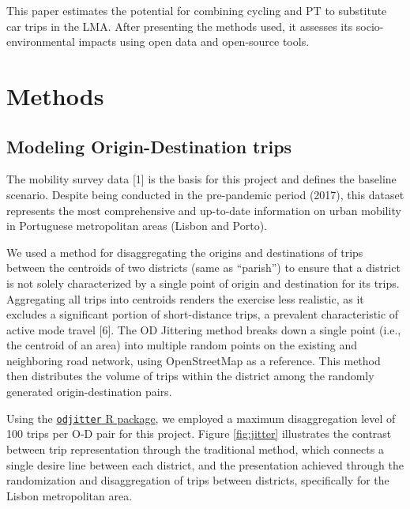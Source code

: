\documentclass[runningheads]{llncs}
\begin{document}
This paper estimates the potential for combining cycling and PT to
substitute car trips in the LMA. After presenting the methods used, it
assesses its socio-environmental impacts using open data and open-source
tools.

\hypertarget{methods}{%
\section{Methods}\label{methods}}

\hypertarget{modeling-origin-destination-trips}{%
\subsection{Modeling Origin-Destination
trips}\label{modeling-origin-destination-trips}}

The mobility survey data {[}1{]} is the basis for this project and
defines the baseline scenario. Despite being conducted in the
pre-pandemic period (2017), this dataset represents the most
comprehensive and up-to-date information on urban mobility in Portuguese
metropolitan areas (Lisbon and Porto).

We used a method for disaggregating the origins and destinations of
trips between the centroids of two districts (same as ``parish'') to
ensure that a district is not solely characterized by a single point of
origin and destination for its trips. Aggregating all trips into
centroids renders the exercise less realistic, as it excludes a
significant portion of short-distance trips, a prevalent characteristic
of active mode travel {[}6{]}. The OD Jittering method breaks down a
single point (i.e., the centroid of an area) into multiple random points
on the existing and neighboring road network, using OpenStreetMap as a
reference. This method then distributes the volume of trips within the
district among the randomly generated origin-destination pairs.

Using the
\href{https://github.com/dabreegster/odjitter}{\texttt{odjitter} R
package}, we employed a maximum disaggregation level of 100 trips per
O-D pair for this project. Figure \ref{fig:jitter} illustrates the
contrast between trip representation through the traditional method,
which connects a single desire line between each district, and the
presentation achieved through the randomization and disaggregation of
trips between districts, specifically for the Lisbon metropolitan area.
\end{document}
